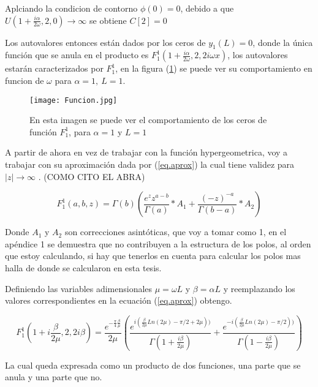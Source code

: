 Aplciando la condicion de contorno $\phi (0) = 0$, debido a que $U (1+\frac{i \alpha}{2 \omega},2,0) \rightarrow \infty $ se obtiene $C[2]=0$


Los autovalores entonces están dados por los ceros de $y _1 (L) = 0 $, donde la única función que se anula en el producto es  $F _1 ^1 (1+\frac{i \alpha}{2 \omega},2,2 i \omega x) $, los autovalores estarán caracterizados por  $F _1 ^1$, en la figura (\ref{fig:funcion}) se puede ver su comportamiento en funcion de $\omega$ para  $\alpha=1, \ L=1$.

\begin{figure}
\centering
\texttt{[image: Funcion.jpg]}
\caption{En esta imagen se puede ver el comportamiento de los ceros de función $F _1 ^1$, para $\alpha=1$ y $L=1$}
\label{fig:funcion}
\end{figure}

A partir de ahora en vez de trabajar con la función hypergeometrica, voy a trabajar con su aproximación dada por (\ref{eq.aprox}) la cual tiene validez para $|z| \rightarrow \infty$ . (COMO CITO EL ABRA)

\begin{equation}
    F _1 ^1 (a,b,z) = \Gamma (b) 
    \left(
    \frac{e^z z ^{a-b} }{\Gamma(a)} * A_1 + \frac{(-z) ^{ -a}}{ \Gamma(b-a)} 
    * A_2
    \right)
\label{eq.aprox}
\end{equation}

Donde $A_1$ y $A_2$ son correcciones asintóticas, que voy a tomar como 1, en el apéndice 1 se demuestra que no contribuyen a la estructura de los polos, al orden que estoy calculando, si hay que tenerlos en cuenta para calcular los polos mas halla de donde se calcularon en esta tesis.

Definiendo las variables adimensionales $\mu = \omega L$  y $\beta = \alpha L $ y reemplazando los valores correspondientes en la ecuación (\ref{eq.aprox}) obtengo. 

\begin{equation}
    F _1 ^1 (1+ i \frac{  \beta}{2 \mu} ,2 ,2 i \beta ) = 
    \frac{e ^{- \frac{\pi}{4} \frac{\beta}{\mu} } }{2 \mu}
    \left(
    \frac{e ^{i (\frac{\beta}{2 \mu} Ln(2 \mu) - \pi/2+ 2 \mu))}}{\Gamma(1+\frac{i \beta}{2 \mu})} + 
    \frac{e ^{- i (\frac{\beta}{2 \mu} Ln(2 \mu) - \pi/2 ))}}{\Gamma(1-\frac{i \beta}{2 \mu})}
    \right)
\label{eq.completa}
\end{equation}




La cual queda expresada como un producto de dos funciones, una parte que se anula y una parte que no.

